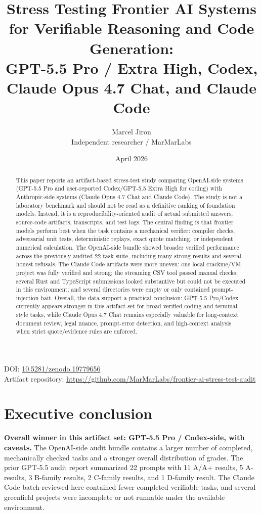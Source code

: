 \documentclass[11pt]{article}
\title{Stress Testing Frontier AI Systems for Verifiable Reasoning and Code Generation:\\
GPT-5.5 Pro / Extra High, Codex, Claude Opus 4.7 Chat, and Claude Code}
\author{Marcel Jiron \\ Independent researcher / MarMarLabs}
\date{April 2026}
\begin{document}
\maketitle

\begin{center}
\small
DOI: \href{https://doi.org/10.5281/zenodo.19779656}{10.5281/zenodo.19779656} \\
Artifact repository: \url{https://github.com/MarMarLabs/frontier-ai-stress-test-audit}
\end{center}

\begin{abstract}
This paper reports an artifact-based stress-test study comparing OpenAI-side systems (GPT-5.5 Pro and user-reported Codex/GPT-5.5 Extra High for coding) with Anthropic-side systems (Claude Opus 4.7 Chat and Claude Code). The study is not a laboratory benchmark and should not be read as a definitive ranking of foundation models. Instead, it is a reproducibility-oriented audit of actual submitted answers, source-code artifacts, transcripts, and test logs. The central finding is that frontier models perform best when the task contains a mechanical verifier: compiler checks, adversarial unit tests, deterministic replays, exact quote matching, or independent numerical calculation. The OpenAI-side bundle showed broader verified performance across the previously audited 22-task suite, including many strong results and several honest refusals. The Claude Code artifacts were more uneven: one local crackme/VM project was fully verified and strong; the streaming CSV tool passed manual checks; several Rust and TypeScript submissions looked substantive but could not be executed in this environment; and several directories were empty or only contained prompt-injection bait. Overall, the data support a practical conclusion: GPT-5.5 Pro/Codex currently appears stronger in this artifact set for broad verified coding and terminal-style tasks, while Claude Opus 4.7 Chat remains especially valuable for long-context document review, legal nuance, prompt-error detection, and high-context analysis when strict quote/evidence rules are enforced.
\end{abstract}

\section{Executive conclusion}

\textbf{Overall winner in this artifact set: GPT-5.5 Pro / Codex-side, with caveats.}
The OpenAI-side audit bundle contains a larger number of completed, mechanically checked tasks and a stronger overall distribution of grades. The prior GPT-5.5 audit report summarized 22 prompts with 11 A/A+ results, 5 A- results, 3 B-family results, 2 C-family results, and 1 D-family result. The Claude Code batch reviewed here contained fewer completed verifiable tasks, and several greenfield projects were incomplete or not runnable under the available environment.
\end{document}
